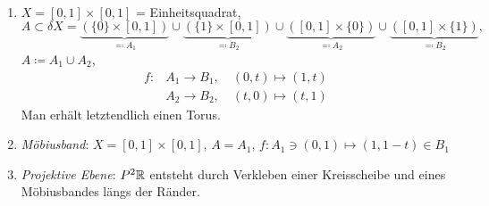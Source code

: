 \begin{example}
  \
  \begin{enumerate}
    \item $ X = [0,1] \times [0,1] $ = Einheitsquadrat,
      \begin{equation*}
        A \subset \delta X = \underbrace{\left( \{ 0 \} \times [0,1] \right)}_{\eqqcolon A_1} \cup \underbrace{\left( \{ 1 \} \times [0,1] \right)}_{\eqqcolon B_2} \cup \underbrace{\left( [0,1] \times \{ 0 \} \right)}_{\eqqcolon A_2} \cup \underbrace{\left( [0,1] \times \{ 1 \} \right)}_{\eqqcolon B_2}\text{,}
      \end{equation*}
      $ A \coloneqq A_1 \cup A_2 $,
      \begin{align*}
        f: &A_1 \to B_1, \quad (0,t) \mapsto (1,t) \\
         &A_2 \to B_2, \quad (t,0) \mapsto (t,1)
      \end{align*}
      Man erhält letztendlich einen Torus.
    \item \emph{Möbiusband}: $ X = [0,1] \times [0,1] $, $ A = A_1 $, $ f: A_1 \ni (0,1) \mapsto (1,1-t) \in B_1 $
    \item \emph{Projektive Ebene}: $ P^2\mathbb{R} $ entsteht durch Verkleben einer Kreisscheibe und eines Möbiusbandes längs der Ränder.
  \end{enumerate}
\end{example}
